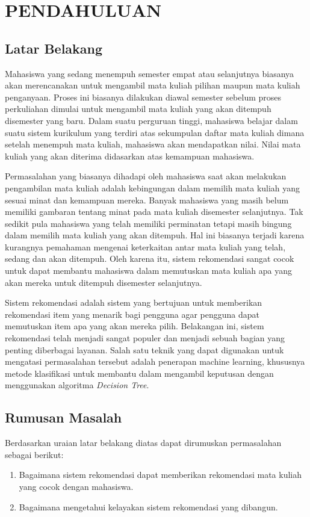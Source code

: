 \section{PENDAHULUAN}

\subsection{Latar Belakang}

Mahasiswa yang sedang menempuh semester empat atau selanjutnya biasanya akan merencanakan untuk mengambil
mata kuliah pilihan maupun mata kuliah penganyaan. Proses ini biasanya dilakukan diawal semester sebelum proses perkuliahan
dimulai untuk mengambil mata kuliah yang akan ditempuh disemester yang baru. Dalam suatu perguruan tinggi, mahasiswa belajar dalam suatu
sistem kurikulum yang terdiri atas sekumpulan daftar mata kuliah dimana setelah menempuh mata kuliah,
mahasiswa akan mendapatkan nilai. Nilai mata kuliah yang akan diterima didasarkan atas kemampuan
mahasiswa.

Permasalahan yang biasanya dihadapi oleh mahasiswa saat akan melakukan pengambilan mata kuliah adalah kebingungan dalam
memilih mata kuliah yang sesuai minat dan kemampuan mereka. Banyak mahasiswa yang masih belum memiliki gambaran tentang
minat pada mata kuliah disemester selanjutnya. Tak sedikit pula mahasiswa yang telah memiliki perminatan tetapi masih
bingung dalam memilih mata kuliah yang akan ditempuh. Hal ini biasanya terjadi karena kurangnya pemahaman mengenai
keterkaitan antar mata kuliah yang telah, sedang dan akan ditempuh. Oleh karena itu, sistem rekomendasi sangat cocok untuk
dapat membantu mahasiswa dalam memutuskan mata kuliah apa yang akan mereka untuk ditempuh disemester selanjutnya.

Sistem rekomendasi adalah sistem yang bertujuan untuk memberikan rekomendasi item yang menarik bagi pengguna agar pengguna
dapat memutuskan item apa yang akan mereka pilih. Belakangan ini, sistem rekomendasi telah menjadi sangat populer dan menjadi
sebuah bagian yang penting diberbagai layanan. Salah satu teknik yang dapat digunakan untuk mengatasi permasalahan tersebut adalah
penerapan machine learning, khususnya metode klasifikasi untuk membantu dalam mengambil keputusan dengan menggunakan algoritma
\emph{Decision Tree}.

\subsection{Rumusan Masalah}
Berdasarkan uraian latar belakang diatas dapat dirumuskan permasalahan sebagai berikut:
\begin{enumerate}
      \setlength\itemsep{0em}
      \item Bagaimana sistem rekomendasi dapat memberikan rekomendasi mata kuliah yang cocok dengan mahasiswa.
      \item Bagaimana mengetahui kelayakan sistem rekomendasi yang dibangun.
\end{enumerate}

